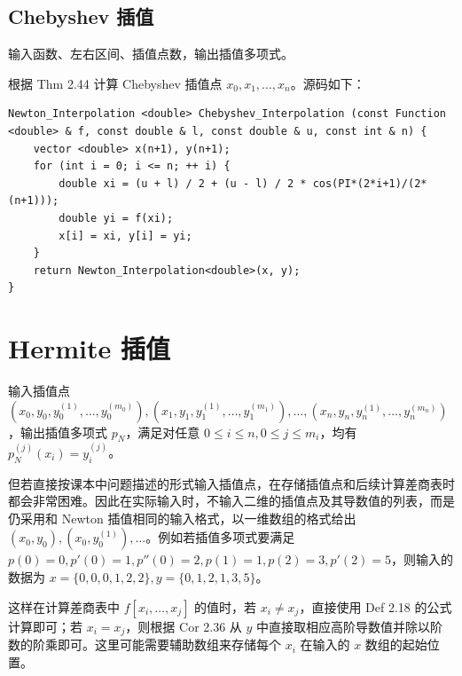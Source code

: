 \documentclass{ctexart}
\begin{document}
\subsection{Chebyshev 插值}
输入函数、左右区间、插值点数，输出插值多项式。

根据 Thm 2.44 计算 Chebyshev 插值点 $x_0,x_1,\dots,x_n$。源码如下：

\begin{verbatim}
Newton_Interpolation <double> Chebyshev_Interpolation (const Function <double> & f, const double & l, const double & u, const int & n) {
    vector <double> x(n+1), y(n+1);
    for (int i = 0; i <= n; ++ i) {
        double xi = (u + l) / 2 + (u - l) / 2 * cos(PI*(2*i+1)/(2*(n+1)));
        double yi = f(xi);
        x[i] = xi, y[i] = yi;
    }
    return Newton_Interpolation<double>(x, y);
}
\end{verbatim}

\section{Hermite 插值}

输入插值点 $(x_0,y_0,y_0^{(1)},\dots,y_0^{(m_0)}),(x_1,y_1,y_1^{(1)},\dots,y_1^{(m_1)}),\dots,(x_n,y_n,y_n^{(1)},\dots,y_n^{(m_n)})$，输出插值多项式 $p_N$，满足对任意 $0\leq i\leq n,0\leq j\leq m_i$，均有 $p_N^{(j)}(x_i)=y_i^{(j)}$。

但若直接按课本中问题描述的形式输入插值点，在存储插值点和后续计算差商表时都会非常困难。因此在实际输入时，不输入二维的插值点及其导数值的列表，而是仍采用和 Newton 插值相同的输入格式，以一维数组的格式给出 $(x_0,y_0),(x_0,y_0^{(1)}),\dots$。例如若插值多项式要满足 $p(0)=0,p'(0)=1,p''(0)=2,p(1)=1,p(2)=3,p'(2)=5$，则输入的数据为 $x=\{0,0,0,1,2,2\},y=\{0,1,2,1,3,5\}$。

这样在计算差商表中 $f[x_i,\dots,x_j]$ 的值时，若 $x_i\neq x_j$，直接使用 Def 2.18 的公式计算即可；若 $x_i=x_j$，则根据 Cor 2.36 从 $y$ 中直接取相应高阶导数值并除以阶数的阶乘即可。这里可能需要辅助数组来存储每个 $x_i$ 在输入的 $x$ 数组的起始位置。
\end{document}
